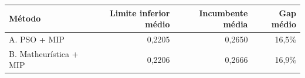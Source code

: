 \begin{tabular}{lrrr}
\toprule
Método & Limite inferior médio & Incumbente média & Gap médio \\
\midrule
A. PSO + MIP & 0,2205 & 0,2650 & 16,5\% \\
B. Matheurística + MIP & 0,2206 & 0,2666 & 16,9\% \\
\bottomrule
\end{tabular}
